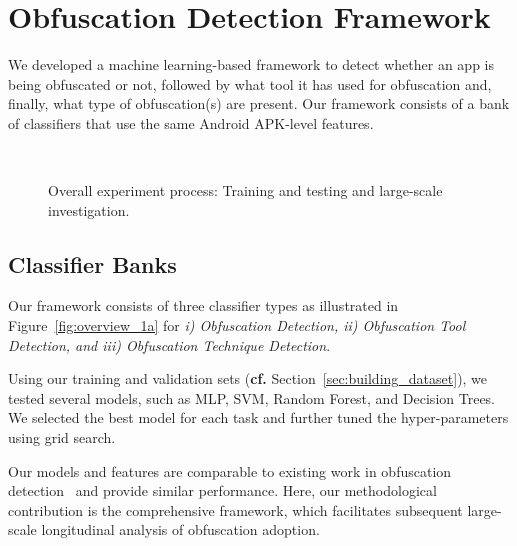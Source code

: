 \section{Obfuscation Detection Framework}
\label{sec:Methodology}

We developed a machine learning-based framework to detect whether an app is being obfuscated or not, followed by what tool it has used for obfuscation and, finally, what type of obfuscation(s) are present. Our framework consists of a bank of classifiers that use the same Android APK-level features.

\begin{figure*}[!h]
    \centering
    \\
    \caption{Overall experiment process: Training and testing and large-scale investigation.}
    \label{fig:overview}
\end{figure*}


\subsection{Classifier Banks}
\label{sec:classifier_bank}

Our framework consists of three classifier types as illustrated in Figure~\ref{fig:overview_1a} for  \textit{i) Obfuscation Detection, ii) Obfuscation Tool Detection, and iii) Obfuscation Technique Detection}.

Using our training and validation sets ({\bf cf.} Section~\ref{sec:building_dataset}), we tested several models, such as MLP, SVM, Random Forest, and Decision Trees. We selected the best model for each task and further tuned the hyper-parameters using grid search.


Our models and features are comparable to existing work in obfuscation detection~\cite{wermke2018large, wang2017changed, mirzaei2019androdet, conti2022obfuscation} and provide similar performance. Here, our methodological contribution is the comprehensive framework, which facilitates subsequent large-scale longitudinal analysis of obfuscation adoption.



